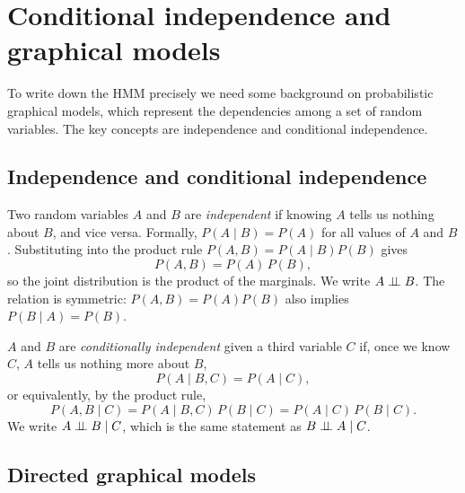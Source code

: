 \section{Conditional independence and graphical models}
\label{sec:pgm}

To write down the HMM precisely we need some background on probabilistic graphical models, which represent the dependencies among a set of random variables. The key concepts are independence and conditional independence.

\subsection{Independence and conditional independence}

Two random variables $A$ and $B$ are \emph{independent} if knowing $A$ tells us nothing about $B$, and vice versa. Formally, $P(A\mid B)=P(A)$ for all values of $A$ and $B$. Substituting into the product rule $P(A,B)=P(A\mid B)P(B)$ gives
\begin{equation}
  P(A,B) = P(A)\,P(B),
\end{equation}
so the joint distribution is the product of the marginals. We write $A\perp\!\!\!\perp B$. The relation is symmetric: $P(A,B)=P(A)P(B)$ also implies $P(B\mid A)=P(B)$.

$A$ and $B$ are \emph{conditionally independent} given a third variable $C$ if, once we know $C$, $A$ tells us nothing more about $B$,
\begin{equation}
  P(A\mid B,C) = P(A\mid C),
\end{equation}
or equivalently, by the product rule,
\begin{equation}
  P(A,B\mid C) = P(A\mid B,C)\,P(B\mid C) = P(A\mid C)\,P(B\mid C).
\end{equation}
We write $A\perp\!\!\!\perp B\mid C$, which is the same statement as $B\perp\!\!\!\perp A\mid C$.

\subsection{Directed graphical models}

